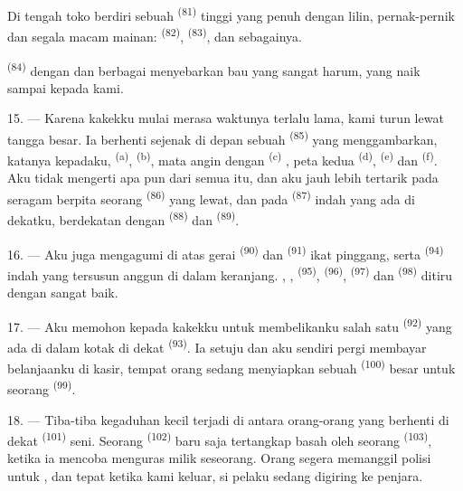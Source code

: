 Di tengah toko berdiri sebuah 
\textsuperscript{(81)} tinggi yang penuh dengan lilin, pernak-pernik
dan segala macam mainan:  \textsuperscript{(82)},
 \textsuperscript{(83)}, dan sebagainya.

 \textsuperscript{(84)} dengan  dan berbagai  menyebarkan bau
yang sangat harum, yang naik sampai kepada kami.

\VUsaut{3.4mm}
\VUsaut{2.8mm}

15. --- Karena kakekku mulai merasa waktunya terlalu lama, kami turun
lewat tangga besar. Ia berhenti sejenak di depan sebuah  \textsuperscript{(85)} yang menggambarkan, katanya
kepadaku,  \textsuperscript{(a)},  \textsuperscript{(b)}, mata angin dengan  \textsuperscript{(c)} , peta kedua  \textsuperscript{(d)},
 \textsuperscript{(e)} dan 
\textsuperscript{(f)}. Aku tidak mengerti apa pun dari semua itu, dan
aku jauh lebih tertarik pada seragam berpita seorang  \textsuperscript{(86)} yang lewat, dan pada 
\textsuperscript{(87)} indah yang ada di dekatku, berdekatan dengan
 \textsuperscript{(88)} dan 
\textsuperscript{(89)}.

16. --- Aku juga mengagumi di atas gerai 
\textsuperscript{(90)} dan  \textsuperscript{(91)}
ikat pinggang, serta  \textsuperscript{(94)}
indah yang tersusun anggun di dalam keranjang. ,
, 
\textsuperscript{(95)}, 
\textsuperscript{(96)},  \textsuperscript{(97)} dan
 \textsuperscript{(98)} ditiru dengan sangat
baik.

\VUsaut{4.4mm}
\VUsaut{2.8mm}

17. --- Aku memohon kepada kakekku untuk membelikanku salah satu
 \textsuperscript{(92)} yang ada di dalam kotak di
dekat  \textsuperscript{(93)}. Ia setuju dan aku
sendiri pergi membayar belanjaanku di kasir, tempat orang sedang
menyiapkan sebuah  \textsuperscript{(100)} besar
untuk seorang  \textsuperscript{(99)}.

18. --- Tiba-tiba kegaduhan kecil terjadi di antara orang-orang yang
berhenti di dekat  \textsuperscript{(101)}
seni. Seorang  \textsuperscript{(102)} baru saja
tertangkap basah oleh seorang 
\textsuperscript{(103)}, ketika ia mencoba menguras milik seseorang.
Orang segera memanggil polisi untuk , dan tepat
ketika kami keluar, si pelaku sedang digiring ke penjara.

\VUsaut{6.0mm}
\VUfilet{22mm}
